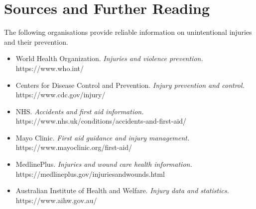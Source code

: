 \section*{Sources and Further Reading}
The following organisations provide reliable information on unintentional injuries and their prevention.

\begin{itemize}
    \item World Health Organization. \textit{Injuries and violence prevention.} https://www.who.int/
    \item Centers for Disease Control and Prevention. \textit{Injury prevention and control.} https://www.cdc.gov/injury/
    \item NHS. \textit{Accidents and first aid information.} https://www.nhs.uk/conditions/accidents-and-first-aid/
    \item Mayo Clinic. \textit{First aid guidance and injury management.} https://www.mayoclinic.org/first-aid/
    \item MedlinePlus. \textit{Injuries and wound care health information.} https://medlineplus.gov/injuriesandwounds.html
    \item Australian Institute of Health and Welfare. \textit{Injury data and statistics.} https://www.aihw.gov.au/
\end{itemize}
